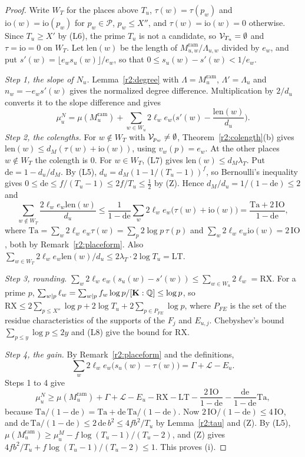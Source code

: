 \begin{proof}
Write $W_T$ for the places above $T_u$, $\tau(w)=\tau(p_w)$ and $\mathrm{io}(w)=\mathrm{io}(p_w)$ for $p_w\in\mathcal P$, $p_w\le X''$, and $\tau(w)=\mathrm{io}(w)=0$ otherwise. Since $T_u\ge X'$ by (L6), the prime $T_u$ is not a candidate, so $\mathcal V_{T_u}=\emptyset$ and $\tau=\mathrm{io}=0$ on $W_T$. Let $\mathrm{len}(w)$ be the length of $M^{\mathrm{ram}}_{u,w}/\Lambda_{u,w}$ divided by $e_w$, and put $s'(w)=\lfloor e_ws_u(w)\rfloor/e_w$, so that $0\le s_u(w)-s'(w)<1/e_w$.

\emph{Step 1, the slope of $N_u$.} Lemma~\ref{r2:degree} with $\Lambda=M^{\mathrm{ram}}_u$, $\Lambda'=\Lambda_u$ and $n_w=-e_ws'(w)$ gives the normalized degree difference. Multiplication by $2/d_u$ converts it to the slope difference and gives
\[
\mu^N_u=\mu(M^{\mathrm{ram}}_u)+\sum_{w\in W_u}2\ell_we_w\Big(s'(w)-\frac{\mathrm{len}(w)}{d_u}\Big).
\]
\emph{Step 2, the colengths.} For $w\notin W_T$ with $\mathcal V_{p_w}\ne\emptyset$, Theorem~\ref{r2:colength}(b) gives $\mathrm{len}(w)\le d_M(\tau(w)+\mathrm{io}(w))$, using $v_w(p)=e_w$. At the other places $w\notin W_T$ the colength is $0$. For $w\in W_T$, (L7) gives $\mathrm{len}(w)\le d_M\lambda_T$. Put $\mathrm{de}=1-d_u/d_M$. By (L5), $d_u=d_M(1-1/(T_u-1))^f$, so Bernoulli's inequality gives $0\le\mathrm{de}\le f/(T_u-1)\le2f/T_u\le\frac12$ by (Z). Hence $d_M/d_u=1/(1-\mathrm{de})\le2$ and
\[
\sum_{w\notin W_T}\frac{2\ell_we_w\mathrm{len}(w)}{d_u}\le\frac1{1-\mathrm{de}}\sum_w2\ell_we_w\big(\tau(w)+\mathrm{io}(w)\big)=\frac{\mathrm{Ta}+2\,\mathrm{IO}}{1-\mathrm{de}},
\]
where $\mathrm{Ta}=\sum_w2\ell_we_w\tau(w)=\sum_p2\log p\,\tau(p)$ and $\sum_w2\ell_we_w\mathrm{io}(w)=2\,\mathrm{IO}$, both by Remark~\ref{r2:placeform}. Also $\sum_{w\in W_T}2\ell_we_w\mathrm{len}(w)/d_u\le2\lambda_T\cdot2\log T_u=\mathrm{LT}$.

\emph{Step 3, rounding.} $\sum_w2\ell_we_w(s_u(w)-s'(w))\le\sum_{w\in W_u}2\ell_w=\mathrm{RX}$. For a prime $p$, $\sum_{w\mid p}\ell_w=\sum_{w\mid p}f_w\log p/[\mathbf K:\mathbb Q]\le\log p$, so $\mathrm{RX}\le2\sum_{p\le X''}\log p+2\log T_u+2\sum_{p\in P_{FE}}\log p$, where $P_{FE}$ is the set of the residue characteristics of the supports of the $F_j$ and $E_{u,j}$. Chebyshev's bound $\sum_{p\le y}\log p\le2y$ and (L8) give the bound for $\mathrm{RX}$.

\emph{Step 4, the gain.} By Remark~\ref{r2:placeform} and the definitions,
\[
\sum_w2\ell_we_w\big(s_u(w)-\tau(w)\big)=\Gamma+\mathcal L-E_u .
\]
Steps 1 to 4 give
\[
\mu^N_u\ge\mu(M^{\mathrm{ram}}_u)+\Gamma+\mathcal L-E_u-\mathrm{RX}-\mathrm{LT}-\frac{2\,\mathrm{IO}}{1-\mathrm{de}}-\frac{\mathrm{de}}{1-\mathrm{de}}\mathrm{Ta},
\]
because $\mathrm{Ta}/(1-\mathrm{de})=\mathrm{Ta}+\mathrm{de}\,\mathrm{Ta}/(1-\mathrm{de})$. Now $2\,\mathrm{IO}/(1-\mathrm{de})\le4\,\mathrm{IO}$, and $\mathrm{de}\,\mathrm{Ta}/(1-\mathrm{de})\le2\,\mathrm{de}\,b^2\le4fb^2/T_u$ by Lemma~\ref{r2:tau} and (Z). By (L5), $\mu(M^{\mathrm{ram}}_u)\ge\mu^M_u-f\log(T_u-1)/(T_u-2)$, and (Z) gives $4fb^2/T_u+f\log(T_u-1)/(T_u-2)\le1$. This proves (i).


\end{proof}
